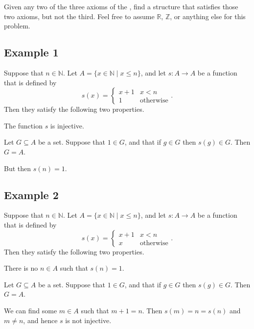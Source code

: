 \Newpage
\begin{exercise} %
	Given any two of the three axioms of the , find a structure that satisfies those two axioms, but not the third. Feel free to assume $\mathbb{R}$, $\mathbb{Z}$, or anything else for this problem.
\end{exercise}

\subsection*{Example 1}
Suppose that $n \in \mathbb{N}$. Let $A = \{ x \in \mathbb{N} \mid x \leq n \}$, and let $s: A \to A$ be a function that is defined by
\[
	s(x) = \begin{cases}
		x + 1 & x < n            \\
		1     & \text{otherwise}
	\end{cases}.
\]
Then they satisfy the following two properties.
\begin{lenumerate}
	\item The function $s$ is injective.
	\item Let $G \subseteq A$ be a set. Suppose that $1 \in G$, and that if $g \in G$ then $s(g) \in G$. Then
	$G = A$.
\end{lenumerate}
But then $s(n) = 1$.

\subsection*{Example 2}
Suppose that $n \in \mathbb{N}$. Let $A = \{ x \in \mathbb{N} \mid x \leq n \}$, and let $s: A \to A$ be a function that is defined by
\[
	s(x) = \begin{cases}
		x + 1 & x < n            \\
		x     & \text{otherwise}
	\end{cases}.
\]
Then they satisfy the following two properties.
\begin{lenumerate}
	\item There is no $n \in A$ such that $s(n) = 1$.
	\item Let $G \subseteq A$ be a set. Suppose that $1 \in G$, and that if $g \in G$ then $s(g) \in G$. Then
	$G = A$.
\end{lenumerate}
We can find some $m \in A$ such that $m + 1 = n$. Then $s(m) = n = s(n)$ and $m \not= n$, and hence $s$ is not injective.

